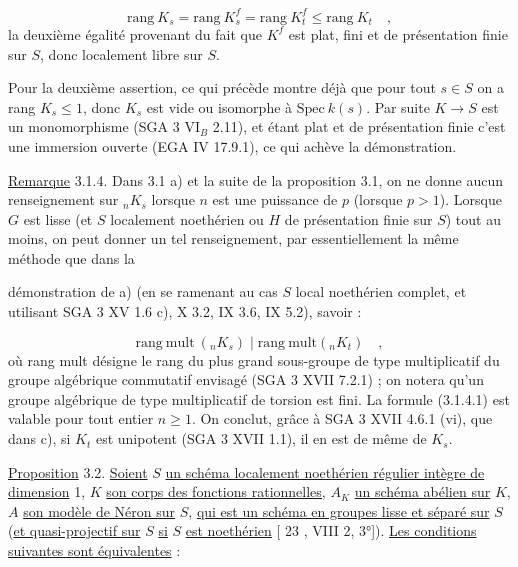 \begin{equation*}
\mathrm{rang}\ K_{s} = \mathrm{rang}\ K^{f}_{s} = \mathrm{rang}\ K^{f}_{t} \leq \mathrm{rang}\ K_{t} \quad ,
\end{equation*}
la deuxième égalité provenant du fait que $K^{f}$ est plat, fini et de présentation finie sur $S$, donc localement libre sur $S$.

Pour la deuxième assertion, ce qui précède montre déjà que pour tout $s \in S$ on a rang $K_{s} \leq 1$, donc $K_{s}$ est vide ou isomorphe à $\mathrm{Spec}\ k(s)$. Par suite $K \longrightarrow S$ est un monomorphisme (SGA 3 VI$_{B}$ 2.11), et étant plat et de présentation finie c'est une immersion ouverte (EGA IV 17.9.1), ce qui achève la démonstration.

\underline{Remarque} 3.1.4. Dans 3.1 a) et la suite de la proposition 3.1, on ne donne aucun renseignement sur ${}_{n}K_{s}$ lorsque $n$ est une puissance de $p$ (lorsque $p > 1$). Lorsque $G$ est lisse (et $S$ localement noethérien ou $H$ de présentation finie sur $S$) tout au moins, on peut donner un tel renseignement, par essentiellement la même méthode que dans la



démonstration de a) (en se ramenant au cas $S$ local noethérien complet, et utilisant SGA 3 XV 1.6 c), X 3.2, IX 3.6, IX 5.2), savoir :

\begin{equation}\tag{3.1.4.1}
\mathrm{rang\ mult}\ ({}_n K_s) \mid \mathrm{rang\ mult}({}_n K_t) \quad ,
\end{equation}
où rang mult désigne le rang du plus grand sous-groupe de type multiplicatif du groupe algébrique commutatif envisagé (SGA 3 XVII 7.2.1) ; on notera qu'un groupe algébrique de type multiplicatif de torsion est fini. La formule (3.1.4.1) est valable pour tout entier $n \geq 1$. On conclut, grâce à SGA 3 XVII 4.6.1 (vi), que dans c), si $K_t$ est unipotent (SGA 3 XVII 1.1), il en est de même de $K_s$.

\underline{Proposition} 3.2. \underline{Soient} $S$ \underline{un schéma localement noethérien régulier intègre de dimension} 1, $K$ \underline{son corps des fonctions rationnelles,} $A_K$ \underline{un schéma abélien sur} $K$, $A$ \underline{son modèle de Néron sur} $S$, \underline{qui est un schéma en groupes lisse et séparé sur} $S$ (\underline{et quasi-projectif sur} $S$ \underline{si} $S$ \underline{est noethérien} [ 23 , VIII 2, 3°]). \underline{Les conditions suivantes sont équivalentes} :

